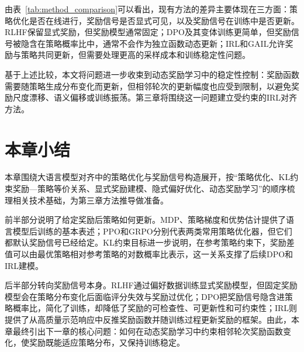 由表~\ref{tab:method_comparison}可以看出，现有方法的差异主要体现在三方面：策略优化是否在线进行，奖励信号是否显式可见，以及奖励信号在训练中是否更新。RLHF保留显式奖励，但奖励模型通常固定；DPO及其变体训练更简单，但奖励信号被隐含在策略概率比中，通常不会作为独立函数动态更新；IRL和GAIL允许奖励与策略共同更新，但需要处理更高的采样成本和训练稳定性问题。

基于上述比较，本文将问题进一步收束到动态奖励学习中的稳定性控制：奖励函数需要随策略生成分布变化而更新，但相邻轮次的更新幅度也应受到限制，以避免奖励尺度漂移、语义偏移或训练振荡。第三章将围绕这一问题建立受约束的IRL对齐方法。

\section{本章小结}

本章围绕大语言模型对齐中的策略优化与奖励信号构造展开，按“策略优化、KL约束奖励—策略等价关系、显式奖励建模、隐式偏好优化、动态奖励学习”的顺序梳理相关技术基础，为第三章方法推导做准备。

前半部分说明了给定奖励后策略如何更新。MDP、策略梯度和优势估计提供了语言模型后训练的基本表述；PPO和GRPO分别代表两类常用策略优化器，但它们都默认奖励信号已经给定。KL约束目标进一步说明，在参考策略约束下，奖励差值可以由最优策略相对参考策略的对数概率比表示，这一关系支撑了后续DPO和IRL建模。

后半部分转向奖励信号本身。RLHF通过偏好数据训练显式奖励模型，但固定奖励模型会在策略分布变化后面临评分失效与奖励过优化；DPO把奖励信号隐含进策略概率比，简化了训练，却降低了奖励的可检查性、可更新性和可约束性；IRL则提供了从高质量示范响应中反推奖励函数并随训练过程更新奖励的框架。由此，本章最终引出下一章的核心问题：如何在动态奖励学习中约束相邻轮次奖励函数变化，使奖励既能适应策略分布，又保持训练稳定。
